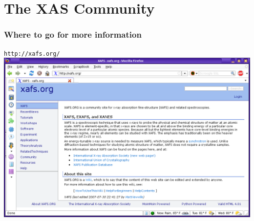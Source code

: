 \documentclass[10pt, xcolor=x11names, compress]{beamer}
\begin{document}

\section[XAS Community]{The XAS Community}

\begin{frame}
  \frametitle{Where to go for more information}
  \begin{center}
    {\LARGE \texttt{http://xafs.org/}}\\[1ex]
    \includegraphics[width=0.95\linewidth]{images/xafsorg.png}
  \end{center}
\end{frame}
\end{document}
